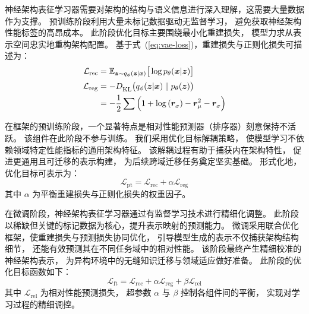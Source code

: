 \documentclass[../main.tex]{subfiles}
\begin{document}

神经架构表征学习器需要对架构的结构与语义信息进行深入理解，这需要大量数据作为支撑。
预训练阶段利用大量未标记数据驱动无监督学习，
避免获取神经架构性能标签的高昂成本。
此阶段优化目标主要围绕最小化重建损失，
模型力求从表示空间忠实地重构架构配置。
基于式~(\ref{eq:vae-loss})，重建损失与正则化损失可描述为：
\begin{align}
	\mathcal{L}_\mathrm{rec} & = \mathbb{E}_{\bm{z} \sim q_{\phi}(\bm{z}|\bm{x})}{\big[\log{p_\theta(\bm{x}|\bm{z})}\big]}                                   \\
	\mathcal{L}_\mathrm{reg} & = {-}D^{\mathstrut}_\mathrm{KL}\big(q_\phi(\bm{z}|\bm{x})\:\|\:p_\theta(\bm{z})\big) \notag                                   \\
	{}                       & = {-}\frac{1}{2}\sum{\left({1+\log{(\bm{r}^{\mathstrut}_{\sigma}) - \bm{r}_{\mu}^{2} - \bm{r}^{\mathstrut}_{\sigma}}}\right)}
\end{align}

在框架的预训练阶段，一个显著特点是相对性能预测器（排序器）刻意保持不活跃。
该组件在此阶段不参与训练。
我们采用优化目标解耦策略，
使模型学习不依赖领域特定性能指标的通用架构特征。
该解耦过程有助于捕获内在架构特性，
促进更通用且可迁移的表示构建，
为后续跨域迁移任务奠定坚实基础。
形式化地，优化目标可表示为：
\begin{equation}
	\mathcal{L}_\mathrm{pt} = \mathcal{L}_\mathrm{rec} + \alpha\mathcal{L}_\mathrm{reg}
\end{equation}
其中 $ \alpha $ 为平衡重建损失与正则化损失的权重因子。


在微调阶段，神经架构表征学习器通过有监督学习技术进行精细化调整。
此阶段以稀缺但关键的标记数据为核心，提升表示映射的预测能力。
微调采用联合优化框架，使重建损失与预测损失协同优化，
引导模型生成的表示不仅捕获架构结构细节，
还能有效预测其在不同任务域中的相对性能。
该阶段最终产生精细校准的神经架构表示，
为异构环境中的无缝知识迁移与领域适应做好准备。
此阶段的优化目标函数如下：
\begin{equation}
	\mathcal{L}_\mathrm{ft} = \mathcal{L}_\mathrm{rec} + \alpha\mathcal{L}_\mathrm{reg} + \beta\mathcal{L}_\mathrm{rel}
\end{equation}
其中 $ \mathcal{L}_\mathrm{rel} $ 为相对性能预测损失，
超参数 $ \alpha $ 与 $ \beta $ 控制各组件间的平衡，
实现对学习过程的精细调控。

\label{sec:ch4-6-building-cross-domain-embeddings}
\end{document}
